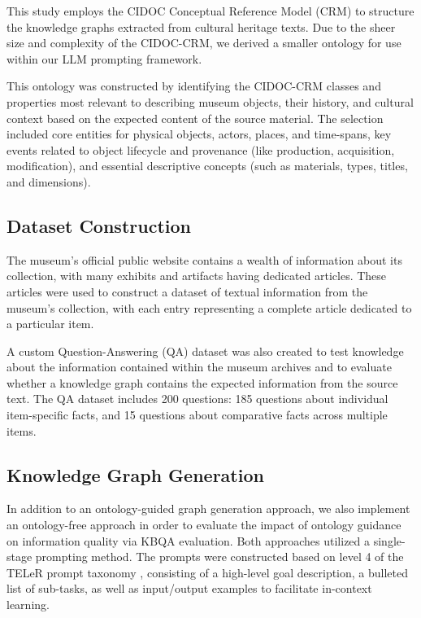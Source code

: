 \documentclass[a4, conference]{IEEEtran}
\begin{document}
This study employs the CIDOC Conceptual Reference Model (CRM) to structure the knowledge graphs extracted from cultural heritage texts. Due to the sheer size and complexity of the CIDOC-CRM, we derived a smaller ontology for use within our LLM prompting framework.

This ontology was constructed by identifying the CIDOC-CRM classes and properties most relevant to describing museum objects, their history, and cultural context based on the expected content of the source material. The selection included core entities for physical objects, actors, places, and time-spans, key events related to object lifecycle and provenance (like production, acquisition, modification), and essential descriptive concepts (such as materials, types, titles, and dimensions).

\subsection{Dataset Construction}

The museum's official public website contains a wealth of information about its collection, with many exhibits and artifacts having dedicated articles. These articles were used to construct a dataset of textual information from the museum's collection, with each entry representing a complete article dedicated to a particular item.

A custom Question-Answering (QA) dataset was also created to test knowledge about the information contained within the museum archives and to evaluate whether a knowledge graph contains the expected information from the source text. The QA dataset includes 200 questions: 185 questions about individual item-specific facts, and 15 questions about comparative facts across multiple items.

\subsection{Knowledge Graph Generation}

In addition to an ontology-guided graph generation approach, we also implement an ontology-free approach in order to evaluate the impact of ontology guidance on information quality via KBQA evaluation. Both approaches utilized a single-stage prompting method. The prompts were constructed based on level 4 of the TELeR prompt taxonomy \cite{santu2023telergeneraltaxonomyllm}, consisting of a high-level goal description, a bulleted list of sub-tasks, as well as input/output examples to facilitate in-context learning.
\end{document}

